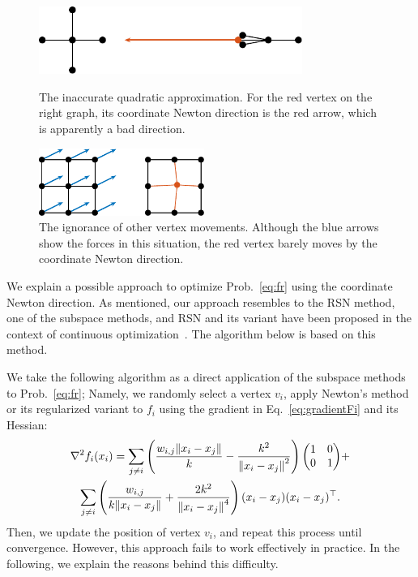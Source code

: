 \documentclass[dvipdfmx,10pt,journal,compsoc]{IEEEtran}
\begin{document}
\begin{figure}[t]
  \centering
  \begin{minipage}{\columnwidth}
    \centering
    \includegraphics[height=2.2cm]{whyRSNfail/whyRSNfail.pdf}
    \caption{
      The inaccurate quadratic approximation.
      For the red vertex on the right graph, its coordinate Newton direction is the red arrow, which is apparently a bad direction.
    }
    \label{fig:whyRSNfail}
  \end{minipage}
  \begin{minipage}{\columnwidth}
    \centering
    \includegraphics[height=2.2cm]{whyRSNfail2/whyRSNfail2.pdf}
    \caption{
      The ignorance of other vertex movements.
      Although the blue arrows show the forces in this situation, the red vertex barely moves by the coordinate Newton direction.
    }
    \label{fig:whyRSNfail2}
  \end{minipage}
\end{figure}

We explain a possible approach to optimize Prob.~\eqref{eq:fr} using the coordinate Newton direction.
As mentioned, our approach resembles to the RSN method, one of the subspace methods, and RSN and its variant have been proposed in the context of continuous optimization~\cite{NEURIPS2019_bc6dc48b,
  fujiRandomizedSubspaceRegularized2022,
  cartisRandomisedSubspaceMethods2022,
  nozawaRandomizedSubspaceGradient2023,
  higuchiFastConvergenceSecondOrder2024}.
The algorithm below is based on this method.

We take the following algorithm as a direct application of the subspace methods to Prob.~\eqref{eq:fr}; Namely, we randomly select a vertex $v_i$, apply Newton's method or its regularized variant to $f_i$ using the gradient in Eq.~\eqref{eq:gradientFi} and its Hessian:
\begin{gather*}
  \nabla^2 f_i(x_i) = \sum_{j \neq i} \left(\frac{w_{i,j}\norm{x_i - x_j}}{k} - \frac{k^2}{\norm{x_i - x_j}^2}\right) \mqty(1&0\\0&1)+ \\
  \sum_{j \neq i} \left(\frac{w_{i,j}}{k \norm{x_i - x_j}} + \frac{2k^2}{\norm{x_i - x_j}^4}\right) (x_i - x_j)(x_i - x_j)^\top.
\end{gather*}
Then, we update the position of vertex $v_i$, and repeat this process until convergence.
However, this approach fails to work effectively in practice.
In the following, we explain the reasons behind this difficulty.
\end{document}
